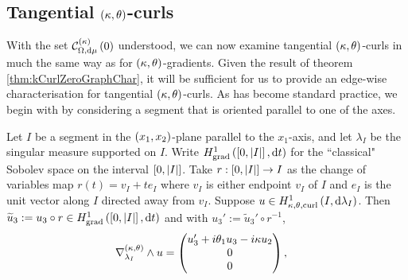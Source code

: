\subsection{Tangential $\left( \kappa, \theta \right)$-curls} \label{sec:ktCurlsTangential}
With the set $\mathcal{C}_{ \Omega, \mathrm{d}\mu}^{(\kappa)}\left( 0 \right)$ understood, we can now examine tangential $\left( \kappa, \theta \right)$-curls in much the same way as for $\left( \kappa, \theta \right)$-gradients.
Given the result of theorem \ref{thm:kCurlZeroGraphChar}, it will be sufficient for us to provide an edge-wise characterisation for tangential $\left( \kappa, \theta \right)$-curls.
As has become standard practice, we begin with by considering a segment that is oriented parallel to one of the axes.
\begin{lemma} \label{lem:ktTanCurlSegmentParallel}
	Let $I$ be a segment in the $\left( x_1,x_2 \right)$-plane parallel to the $x_1$-axis, and let $\lambda_I$ be the singular measure supported on $I$.
	Write $H^1_\mathrm{grad}\left( \left[ 0,\left\lvert I \right\rvert \right], \mathrm{d}t \right)$ for the ``classical" Sobolev space on the interval $\left[ 0,\left\lvert I \right\rvert \right]$.
	Take $r:\left[ 0,\left\lvert I \right\rvert \right]\rightarrow I$ as the change of variables map $r(t) = v_I + te_I$ where $v_I$ is either endpoint $v_I$ of $I$ and $e_I$ is the unit vector along $I$ directed away from $v_I$.
	Suppose $u\in H^1_{\kappa,\theta,\mathrm{curl}}\left( I, \mathrm{d}\lambda_I \right)$.
	Then $\widetilde{u}_3 := u_3 \circ r \in H^1_\mathrm{grad}\left( \left[ 0,\left\lvert I \right\rvert \right], \mathrm{d}t \right)$ and with $u_3' := \widetilde{u}_3' \circ r^{-1}$,
	\begin{align*}
		\nabla_{\lambda_I}^{\left( \kappa, \theta \right)}\wedge u &= 
		\begin{pmatrix} u_3' + i\theta_1 u_3 - i\kappa u_2 \\ 0 \\ 0 \end{pmatrix},
	\end{align*}
\end{lemma}
